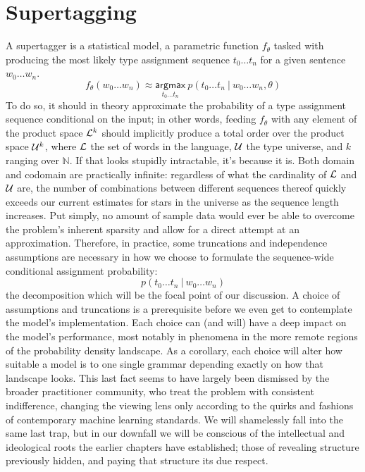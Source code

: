 \section{Supertagging}
A supertagger is a statistical model, a parametric function $f_\theta$ tasked with producing the most likely type assignment sequence $t_0 \dots t_n$ for a given sentence $w_0 \dots w_n$.
\begin{equation}
	f_\theta(w_0 \dots w_n) \approx \underset{t_0\dots t_n}{\mathsf{argmax}} ~ p(t_0\dots t_n \ | \ w_0 \dots w_n, \theta)
\end{equation}
To do so, it should in theory approximate the probability of a type assignment sequence conditional on the input; in other words, feeding $f_\theta$ with any element of the product space $\mathcal{L}^k$ should implicitly produce a total order over the product space $\mathcal{U}^{k}$, where $\mathcal{L}$ the set of words in the language, $\mathcal{U}$ the type universe, and $k$ ranging over $\mathbb{N}$.
If that looks stupidly intractable, it's because it is.
Both domain and codomain are practically infinite: regardless of what the cardinality of $\mathcal{L}$ and $\mathcal{U}$ are, the number of combinations between different sequences thereof quickly exceeds our current estimates for stars in the universe as the sequence length increases.
Put simply, no amount of sample data would ever be able to overcome the problem's inherent sparsity and allow for a direct attempt at an approximation.
Therefore, in practice, some truncations and independence assumptions are necessary in how we choose to formulate the sequence-wide conditional assignment probability:
\begin{equation}\label{equation:supertag}
p(t_0\dots t_n \ | \ w_0 \dots w_n)
\end{equation}
the decomposition which will be the focal point of our discussion.
A choice of assumptions and truncations is a prerequisite before we even get to contemplate the model's implementation.
Each choice can (and will) have a deep impact on the model's performance, most notably in phenomena in the more remote regions of the probability density landscape.
As a corollary, each choice will alter how suitable a model is to one single grammar depending exactly on how that landscape looks.
This last fact seems to have largely been dismissed by the broader practitioner community, who treat the problem with consistent indifference, changing the viewing lens only according to the quirks and fashions of contemporary machine learning standards.
We will shamelessly fall into the same last trap, but in our downfall we will be conscious of the intellectual and ideological roots the earlier chapters have established; those of revealing structure previously hidden, and paying that structure its due respect.

